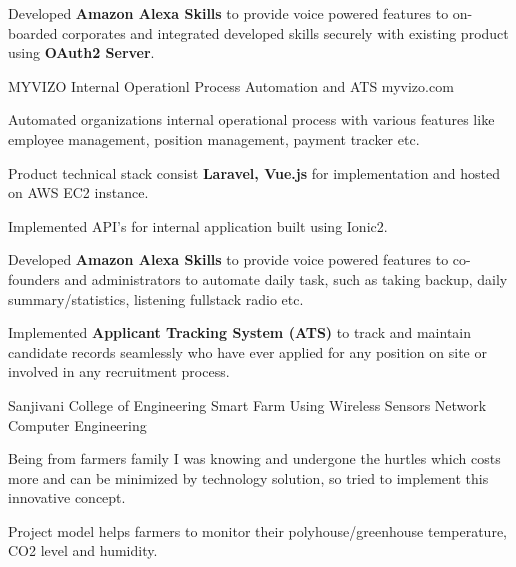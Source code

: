 \begin{cventries}
{\begin{cvitems}
        \item {Developed \textbf{Amazon Alexa Skills} to provide voice powered features to on-boarded corporates and integrated developed skills securely with existing product using \textbf{OAuth2 Server}. }
        \\
      \end{cvitems}
    }
    \cventry
    {MYVIZO} %
    {Internal Operationl Process Automation and ATS} %
    {myvizo.com} %
    { } %
    {
      \begin{cvitems} %
        \item {Automated organizations internal operational process with various features like employee management, position management, payment tracker etc.}
        \item {Product technical stack consist \textbf{Laravel, Vue.js} for implementation and hosted on AWS EC2 instance.}
        \item {Implemented API's for internal application built using Ionic2.}
        \item {Developed \textbf{Amazon Alexa Skills} to provide voice powered features to co-founders and administrators to automate daily task, such as taking backup, daily summary/statistics, listening fullstack radio etc. }
        \item {Implemented \textbf{Applicant Tracking System (ATS)} to track and maintain candidate records  seamlessly who have ever applied for any position on site or involved in any recruitment process.}
        \\
      \end{cvitems}
    }
    \cventry
    {Sanjivani College of Engineering} %
    {Smart Farm Using Wireless Sensors Network} %
    {Computer Engineering} %
    { } %
    {
      \begin{cvitems} %
        \item {Being from farmers family I was knowing and undergone the hurtles which costs more and can be minimized by technology solution, so tried to implement this innovative concept.}
        \item {Project model helps farmers to monitor their polyhouse/greenhouse temperature, CO2 level and humidity.}

\end{cvitems}}
\end{cventries}

